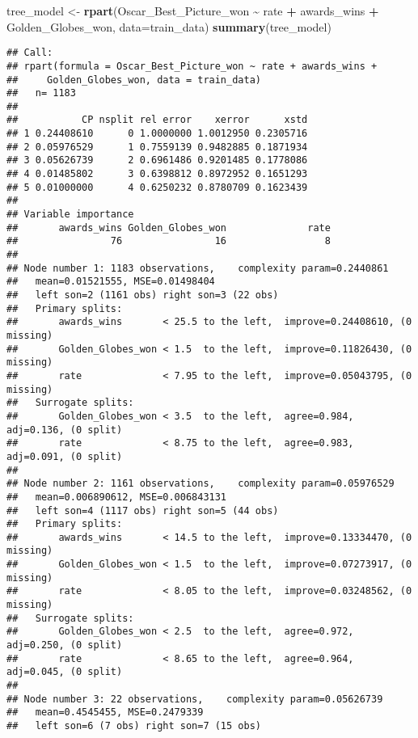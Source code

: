 \documentclass[
]{article}
\newenvironment{Shaded}{\begin{snugshade}}{\end{snugshade}}
\newcommand{\AttributeTok}[1]{\textcolor[rgb]{0.13,0.29,0.53}{#1}}
\newcommand{\FunctionTok}[1]{\textcolor[rgb]{0.13,0.29,0.53}{\textbf{#1}}}
\newcommand{\NormalTok}[1]{#1}
\newcommand{\OtherTok}[1]{\textcolor[rgb]{0.56,0.35,0.01}{#1}}
\newcommand{\SpecialCharTok}[1]{\textcolor[rgb]{0.81,0.36,0.00}{\textbf{#1}}}
\begin{document}
\begin{Shaded}
\begin{Highlighting}[]
\NormalTok{tree\_model }\OtherTok{\textless{}{-}} \FunctionTok{rpart}\NormalTok{(Oscar\_Best\_Picture\_won }\SpecialCharTok{\textasciitilde{}}\NormalTok{ rate }\SpecialCharTok{+}\NormalTok{ awards\_wins }\SpecialCharTok{+}\NormalTok{ Golden\_Globes\_won, }\AttributeTok{data=}\NormalTok{train\_data)}
\FunctionTok{summary}\NormalTok{(tree\_model)}
\end{Highlighting}
\end{Shaded}

\begin{verbatim}
## Call:
## rpart(formula = Oscar_Best_Picture_won ~ rate + awards_wins + 
##     Golden_Globes_won, data = train_data)
##   n= 1183 
## 
##           CP nsplit rel error    xerror      xstd
## 1 0.24408610      0 1.0000000 1.0012950 0.2305716
## 2 0.05976529      1 0.7559139 0.9482885 0.1871934
## 3 0.05626739      2 0.6961486 0.9201485 0.1778086
## 4 0.01485802      3 0.6398812 0.8972952 0.1651293
## 5 0.01000000      4 0.6250232 0.8780709 0.1623439
## 
## Variable importance
##       awards_wins Golden_Globes_won              rate 
##                76                16                 8 
## 
## Node number 1: 1183 observations,    complexity param=0.2440861
##   mean=0.01521555, MSE=0.01498404 
##   left son=2 (1161 obs) right son=3 (22 obs)
##   Primary splits:
##       awards_wins       < 25.5 to the left,  improve=0.24408610, (0 missing)
##       Golden_Globes_won < 1.5  to the left,  improve=0.11826430, (0 missing)
##       rate              < 7.95 to the left,  improve=0.05043795, (0 missing)
##   Surrogate splits:
##       Golden_Globes_won < 3.5  to the left,  agree=0.984, adj=0.136, (0 split)
##       rate              < 8.75 to the left,  agree=0.983, adj=0.091, (0 split)
## 
## Node number 2: 1161 observations,    complexity param=0.05976529
##   mean=0.006890612, MSE=0.006843131 
##   left son=4 (1117 obs) right son=5 (44 obs)
##   Primary splits:
##       awards_wins       < 14.5 to the left,  improve=0.13334470, (0 missing)
##       Golden_Globes_won < 1.5  to the left,  improve=0.07273917, (0 missing)
##       rate              < 8.05 to the left,  improve=0.03248562, (0 missing)
##   Surrogate splits:
##       Golden_Globes_won < 2.5  to the left,  agree=0.972, adj=0.250, (0 split)
##       rate              < 8.65 to the left,  agree=0.964, adj=0.045, (0 split)
## 
## Node number 3: 22 observations,    complexity param=0.05626739
##   mean=0.4545455, MSE=0.2479339 
##   left son=6 (7 obs) right son=7 (15 obs)

\end{verbatim}
\end{document}
